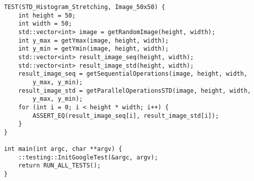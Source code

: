 \documentclass{report}
\begin{document}
\begin{lstlisting}
TEST(STD_Histogram_Stretching, Image_50x50) {
    int height = 50;
    int width = 50;
    std::vector<int> image = getRandomImage(height, width);
    int y_max = getYmax(image, height, width);
    int y_min = getYmin(image, height, width);
    std::vector<int> result_image_seq(height, width);
    std::vector<int> result_image_std(height, width);
    result_image_seq = getSequentialOperations(image, height, width,
        y_max, y_min);
    result_image_std = getParallelOperationsSTD(image, height, width,
        y_max, y_min);
    for (int i = 0; i < height * width; i++) {
        ASSERT_EQ(result_image_seq[i], result_image_std[i]);
    }
}

int main(int argc, char **argv) {
    ::testing::InitGoogleTest(&argc, argv);
    return RUN_ALL_TESTS();
}

\end{lstlisting}
\end{document}

